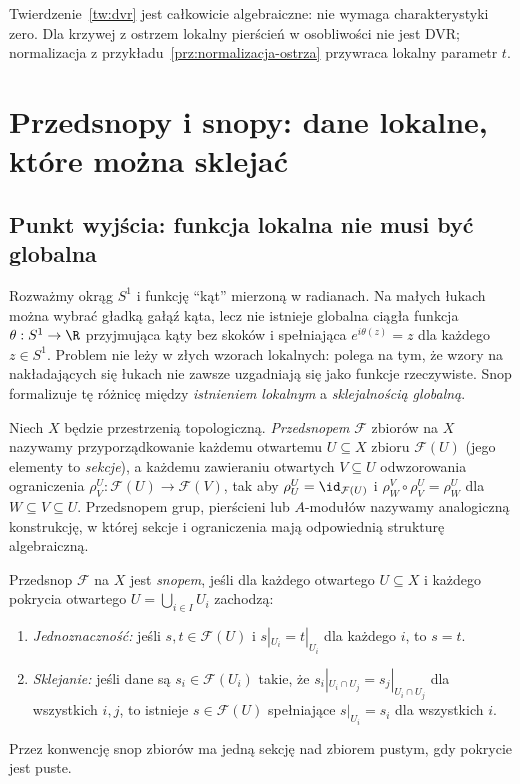 \begin{uwaga}
Twierdzenie~\ref{tw:dvr} jest całkowicie algebraiczne:
nie wymaga charakterystyki zero. Dla krzywej z ostrzem
lokalny pierścień w osobliwości nie jest DVR;
normalizacja z przykładu~\ref{prz:normalizacja-ostrza}
przywraca lokalny parametr $t$.
\end{uwaga}

\section{Przedsnopy i snopy: dane lokalne, które można sklejać}
\label{sec:snopy}

\subsection{Punkt wyjścia: funkcja lokalna nie musi być globalna}
Rozważmy okrąg $S^1$ i funkcję ``kąt'' mierzoną w radianach.
Na małych łukach można wybrać gładką gałąź kąta, lecz
nie istnieje globalna ciągła funkcja $\theta:S^1\to\R$
przyjmująca kąty bez skoków i spełniająca
$e^{i\theta(z)}=z$ dla każdego $z\in S^1$.
Problem nie leży w złych wzorach lokalnych: polega na tym,
że wzory na nakładających się łukach nie zawsze
uzgadniają się jako funkcje rzeczywiste. Snop formalizuje
tę różnicę między \emph{istnieniem lokalnym} a
\emph{sklejalnością globalną}.

\begin{definicja}
Niech $X$ będzie przestrzenią topologiczną.
\emph{Przedsnopem} $\mathcal F$ zbiorów na $X$ nazywamy
przyporządkowanie każdemu otwartemu $U\subseteq X$
zbioru $\mathcal F(U)$ (jego elementy to \emph{sekcje}),
a każdemu zawieraniu otwartych $V\subseteq U$
odwzorowania ograniczenia
$\rho^U_V:\mathcal F(U)\to\mathcal F(V)$, tak aby
$\rho^U_U=\id_{\mathcal F(U)}$ i
$\rho^V_W\circ\rho^U_V=\rho^U_W$ dla $W\subseteq V\subseteq U$.
Przedsnopem grup, pierścieni lub $A$-modułów nazywamy
analogiczną konstrukcję, w której sekcje i ograniczenia
mają odpowiednią strukturę algebraiczną.
\end{definicja}

\begin{definicja}[Snop]
\label{def:snop}
Przedsnop $\mathcal F$ na $X$ jest \emph{snopem},
jeśli dla każdego otwartego $U\subseteq X$ i każdego
pokrycia otwartego $U=\bigcup_{i\in I}U_i$ zachodzą:
\begin{enumerate}[label=(S\arabic*)]
\item \emph{Jednoznaczność:} jeśli $s,t\in\mathcal F(U)$
i $s|_{U_i}=t|_{U_i}$ dla każdego $i$, to $s=t$.
\item \emph{Sklejanie:} jeśli dane są $s_i\in\mathcal F(U_i)$
takie, że $s_i|_{U_i\cap U_j}=s_j|_{U_i\cap U_j}$
dla wszystkich $i,j$, to istnieje $s\in\mathcal F(U)$
spełniające $s|_{U_i}=s_i$ dla wszystkich $i$.
\end{enumerate}
Przez konwencję snop zbiorów ma jedną sekcję nad
zbiorem pustym, gdy pokrycie jest puste.
\end{definicja}

